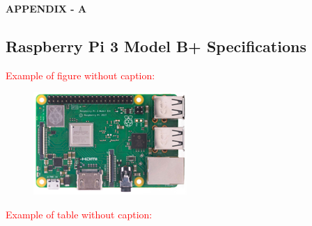 \newpage
\thispagestyle{empty}
\begin{center}
    {\bfseries APPENDIX - A }
    \vspace{1\baselineskip}
\end{center}

\subsection*{Raspberry Pi 3 Model B+ Specifications} 

    \noindent \textcolor{red}{Example of figure without caption:}
    \begin{figure}[h]
        \centering
        \includegraphics{Images/rpi3-modelB.png}
    \end{figure}



    \noindent \textcolor{red}{Example of table without caption:}
    


\clearpage{}